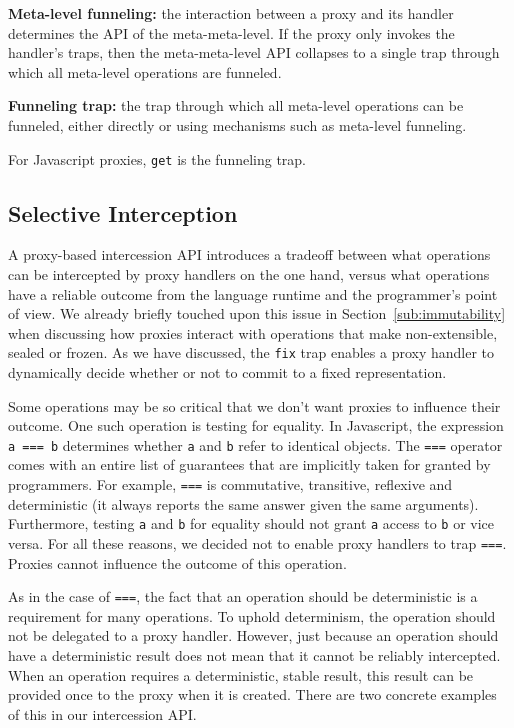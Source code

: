 \documentclass{acm_proc_article-sp}
\begin{document}
\textbf{Meta-level funneling:} the interaction between a proxy and its handler determines the API of the meta-meta-level. If the proxy only invokes the handler's traps, then the meta-meta-level API collapses to a single trap through which all meta-level operations are funneled.

\textbf{Funneling trap:} the trap through which all meta-level operations can be funneled, either directly or using mechanisms such as meta-level funneling.

For Javascript proxies, \texttt{get} is the funneling trap.

\subsection{Selective Interception}

A proxy-based intercession API introduces a tradeoff between what operations can be intercepted by proxy handlers on the one hand, versus what operations have a reliable outcome from the language runtime and the programmer's point of view. We already briefly touched upon this issue in Section~\ref{sub:immutability} when discussing how proxies interact with operations that make non-extensible, sealed or frozen. As we have discussed, the \texttt{fix} trap enables a proxy handler to dynamically decide whether or not to commit to a fixed representation.

Some operations may be so critical that we don't want proxies to influence their outcome. One such operation is testing for equality. In Javascript, the expression \texttt{a === b} determines whether \texttt{a} and \texttt{b} refer to identical objects. The \texttt{===} operator comes with an entire list of guarantees that are implicitly taken for granted by programmers. For example, \texttt{===} is commutative, transitive, reflexive and deterministic (it always reports the same answer given the same arguments). Furthermore, testing \texttt{a} and \texttt{b} for equality should not grant \texttt{a} access to \texttt{b} or vice versa. For all these reasons, we decided not to enable proxy handlers to trap \texttt{===}. Proxies cannot influence the outcome of this operation.

As in the case of \texttt{===}, the fact that an operation should be deterministic is a requirement for many operations. To uphold determinism, the operation should not be delegated to a proxy handler. However, just because an operation should have a deterministic result does not mean that it cannot be reliably intercepted. When an operation requires a deterministic, stable result, this result can be provided once to the proxy when it is created. There are two concrete examples of this in our intercession API.
\end{document}
